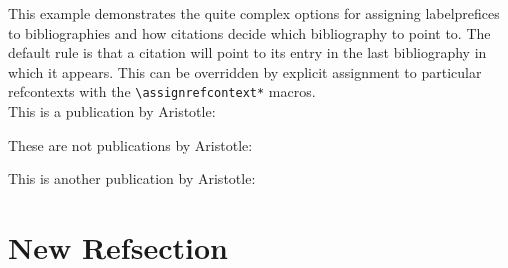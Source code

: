 \documentclass[a4paper]{article}
\newcommand{\cmd}[1]{\texttt{\textbackslash #1}}
\begin{document}
This example demonstrates the quite complex options for assigning
labelprefices to bibliographies and how citations decide which bibliography
to point to. The default rule is that a citation will point to its entry in
the last bibliography in which it appears. This can be overridden by
explicit assignment to particular refcontexts with the
\cmd{assignrefcontext*} macros.\\


This is a publication by Aristotle:
\cite{aristotle:anima} %

These are not publications by Aristotle:
\cite{yoon} %
\cite{worman} %
\cite{piccato} %
\cite{nussbaum} %

This is another publication by Aristotle:
\cite{aristotle:physics} %

\begin{refcontext}[labelprefix=R]
\printbibliography[keyword=primary, title={Aristotle Publications}]
\end{refcontext}

\begin{refcontext}[labelprefix=S]
\printbibliography[ notkeyword=primary, title={Other publications}]
\end{refcontext}

\begin{refcontext}[labelprefix=Q]
\printbibliography[filter=cats, title={Other publications}]
\end{refcontext}

\begin{refcontext}[sorting=nty]
\printbibliography[resetnumbers, notkeyword=primary, title={More Other publications}]
\cite{nussbaum} %
\end{refcontext}

\section*{New Refsection}
\newrefsection
\cite{worman} %
\begin{refcontext}[sorting=nty, labelprefix=T]
\printbibliography[resetnumbers, notkeyword=primary, title={More Other publications}]
\end{refcontext}
\end{document}
